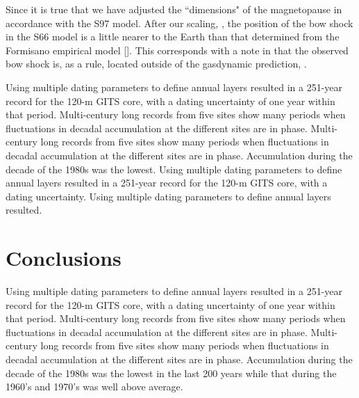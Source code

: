 \documentclass[jgrga]{agu2001}
\let\eject\relax
\begin{document}
\begin{article}
Since it is true that we have adjusted the ``dimensions" of the 
magnetopause in accordance
with the S97 model. After our scaling, ,
the position of the bow shock in the S66 model is a little nearer to
the Earth than that determined from the Formisano empirical model
[]. This corresponds with a
note in  that the observed
bow shock is, as a rule, located outside of the gasdynamic prediction,
.

Using multiple dating
parameters to define annual layers resulted in
a 251-year record for the 120-m GITS core, with 
a dating uncertainty of one year within that period.
Multi-century long records from five sites
show many periods when fluctuations in 
decadal accumulation at
the different sites are in phase.
Multi-century long records from five sites
show many periods when fluctuations in 
decadal accumulation at
the different sites are in phase.
Accumulation during the decade of the 1980s was the lowest.
Using multiple dating
parameters to define annual layers resulted in
a 251-year record for the 120-m GITS core, with 
a dating uncertainty.
Using multiple dating
parameters to define annual layers resulted.

\eject

\section{Conclusions}
Using multiple dating
parameters to define annual layers resulted in
a 251-year record for the 120-m GITS core, with 
a dating uncertainty of one year within that period.
Multi-century long records from five sites
show many periods when fluctuations in 
decadal accumulation at
the different sites are in phase.
Multi-century long records from five sites
show many periods when fluctuations in 
decadal accumulation at
the different sites are in phase.
Accumulation during the decade of the 1980s was the lowest
in
the last 200 years while that during the 1960's and 1970's
was well above average.

%
%
%
%





\end{article}
\end{document}
